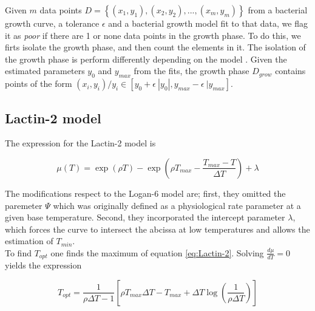 \documentclass[titlepage,11pt]{article}
\begin{document}
\begin{linenumbers}
		Given $ m $ data points $ D =  \left\{(x_1, y_1), (x_2, y_2), ... , (x_m, y_m)\right\} $ from a bacterial growth curve, a tolerance $ \epsilon $ and a bacterial growth model fit to that data, we flag it as \textit{poor} if there are 1 or none data points in the growth phase. To do this, we firts isolate the growth phase, and then count the elements in it. The isolation of the growth phase is perform differently depending on the model . 
		Given the estimated parameters $ y_{0} $ and $ y_{max} $ from the fits, the growth phase $D_{grow} $ contains points of the form $ (x_i, y_i) / y_i \in [y_0 + \epsilon\ |y_0| , y_{max} - \epsilon \ |y_{max}]$. 
		
		\subsection{Lactin-2 model}\label{subsec:Lactin-2}
		The expression for the Lactin-2 model is 
		\begin{linenomath*}
			\begin{equation}\label{eq:Lactin-2}
			\mu(T) = \exp(\rho T) - \exp\left(\rho T_{max} - \frac{T_{max}-T}{\Delta T}\right) + \lambda	
			\end{equation}
		\end{linenomath*}
		
		The modifications respect to the Logan-6 model are; first, they omitted the paremeter $ \Psi $ which was originally defined as a physiological rate parameter at a given base temperature. Second, they incorporated the intercept parameter $ \lambda $, which forces the curve to intersect the abcissa at low temperatures and allows the estimation of $ T_{min} $.\\
		To find $ T_{opt} $ one finds the maximum of equation \ref{eq:Lactin-2}. Solving $ \frac{d\mu}{dT}  = 0$ yields the expression
		\begin{linenomath*}
			\begin{equation}\label{eq:Topt}
			T_{opt} = \frac{1}{\rho\Delta T  -1}\left[\rho T_{max} \Delta T - T_{max} + \Delta T \log\left(\frac{1}{\rho\Delta T }\right) \right]
			\end{equation}
		\end{linenomath*}
	\end{linenumbers}
	
	\newpage
	
	
\end{document}
